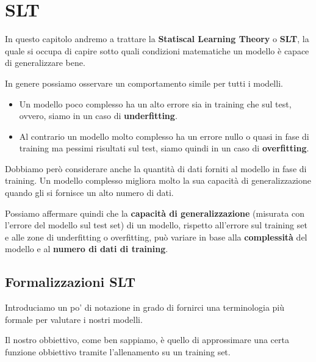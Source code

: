 \chapter{SLT}
In questo capitolo andremo a trattare la \textbf{Statiscal Learning Theory} o \textbf{SLT}, la quale si occupa di capire
sotto quali condizioni matematiche un modello \`e capace di generalizzare bene.

In genere possiamo osservare un comportamento simile per tutti i modelli.
\begin{itemize}
	\item Un modello poco complesso ha un alto errore sia in training che sul test, ovvero, siamo in un caso di
	      \textbf{underfitting}.
	\item Al contrario un modello molto complesso ha un errore nullo o quasi in fase di training ma pessimi risultati sul
	      test, siamo quindi in un caso di \textbf{overfitting}.
\end{itemize}
Dobbiamo per\`o considerare anche la quantit\`a di dati forniti al modello in fase di training. Un modello complesso
migliora molto la sua capacit\`a di generalizzazione quando gli si fornisce un alto numero di dati.

Possiamo affermare quindi che la \textbf{capacit\`a di generalizzazione} (misurata con l'errore del modello sul test set)
di un modello, rispetto all'errore sul training set e alle zone di underfitting o overfitting, pu\`o variare in base alla
\textbf{complessit\`a} del modello e al \textbf{numero di dati di training}.

\section{Formalizzazioni SLT}
Introduciamo un po' di notazione in grado di fornirci una terminologia pi\`u formale per valutare i nostri modelli.

Il nostro obbiettivo, come ben sappiamo, \`e quello di approssimare una certa funzione obbiettivo tramite l'allenamento
su un training set.